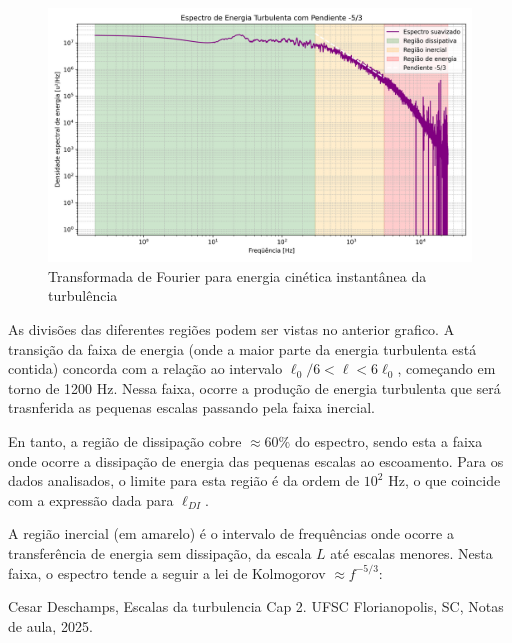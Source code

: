 \documentclass[12pt]{article}
\begin{document}
\begin{figure}[H]
	\centering
	\includegraphics[width=.65\textwidth]{figures/6}
	\caption{Transformada de Fourier para energia cinética instantânea da turbulência}
\end{figure}

As divisões das diferentes regiões podem ser vistas no anterior grafico.
A transição da faixa de energia (onde a maior parte da energia turbulenta está contida) concorda com a relação ao intervalo $\ell_0/6 < \ell < 6\ell_0$, começando em torno de 1200 Hz. Nessa faixa, ocorre a produção de energia turbulenta que será trasnferida as pequenas escalas passando pela faixa inercial.

En tanto, a região de dissipação cobre $\approx 60\%$ do espectro, sendo esta a faixa onde ocorre a dissipação de energia das pequenas escalas ao escoamento. Para os dados analisados, o limite para esta região é da ordem de $10^2$ Hz, o que coincide com a expressão dada para $\ell_{DI}$.

A região inercial (em amarelo) é o intervalo de frequências onde ocorre a transferência de energia sem dissipação, da escala $L$ até escalas menores. Nesta faixa, o espectro tende a seguir a lei de Kolmogorov $\approx f^{-5/3}$:


\begin{thebibliography}{999}
	
	
	Cesar Deschamps,
	Escalas da turbulencia Cap 2.
	UFSC Florianopolis, SC,
	Notas de aula,
	2025.
		
	
\end{thebibliography}
\end{document}
